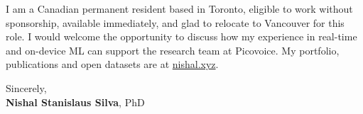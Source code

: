 \documentclass[11pt]{article}
\newcommand{\clName}{Nishal Stanislaus Silva}
\newcommand{\clSite}{https://nishal.xyz}
\newcommand{\clTeam}{the research team}
\begin{document}
I am a Canadian permanent resident based in Toronto, eligible to work without sponsorship, available immediately, and glad to relocate to Vancouver for this role. I would welcome the opportunity to discuss how my experience in real-time and on-device ML can support \clTeam{} at Picovoice. My portfolio, publications and open datasets are at \href{\clSite}{nishal.xyz}.

\vspace{12pt}
Sincerely,\\[2pt]
\textbf{\clName}, PhD
\end{document}

